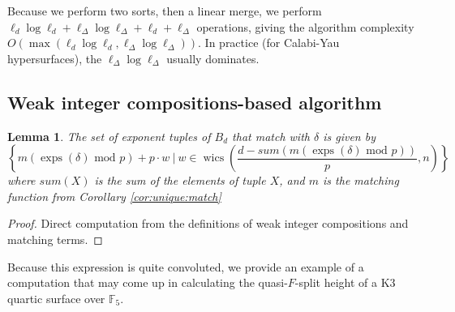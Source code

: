 \documentclass[a4paper]{article}
\newtheorem{lem}[thm]{Lemma}
\theoremstyle{definition}
\theoremstyle{remark}
\newcommand{\exps}{\operatorname{exps}}
\newcommand{\wics}{\operatorname{wics}}
\newcommand{\mathmod}{ \text{ mod }}
\begin{document}
Because we perform two sorts, then a linear merge, 
we perform 
$\ell_{d} \log \ell_{d} + \ell_{\Delta} \log \ell_{\Delta} + \ell_{d} + \ell_{\Delta}$ operations, 
giving the algorithm complexity 
$O(\max(\ell_{d} \log \ell_{d}, \ell_{\Delta} \log \ell_{\Delta}))$.
In practice (for Calabi-Yau hypersurfaces), 
the $\ell_{\Delta} \log \ell_{\Delta}$ usually dominates.

\subsection{Weak integer compositions-based algorithm}

\begin{lem}
    \label{lem:generate:matching}
    The set of exponent tuples of \(B_{d}\) that match with $\delta$ is given by 
    \[
        \left\{ m(\exps(\delta) \mathmod p) + p\cdot w ~\Big|~ w \in \wics 
        \left(\frac{d - sum(m(\exps(\delta) \mathmod p))}{p}, n \right) \right\}
    \]
    where $sum(X)$ is the sum of the elements of tuple $X$, and $m$ is the matching function from Corollary \ref{cor:unique:match}
\end{lem}

\begin{proof}
    Direct computation from the definitions of weak integer compositions and matching terms.
\end{proof}


Because this expression is quite convoluted, we 
provide an example of a computation 
that may come up in calculating the quasi-\(F\)-split 
height of a K3 quartic surface over $\mathbb{F}_5$.
\end{document}
